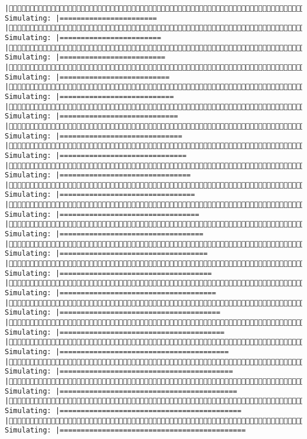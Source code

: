 \documentclass[]{article}
\begin{document}
\begin{verbatim}
|(10/10) Simulating: |=======================                              |(10/10) Simulating: |========================                             |(10/10) Simulating: |=========================                            |(10/10) Simulating: |==========================                           |(10/10) Simulating: |===========================                          |(10/10) Simulating: |============================                         |(10/10) Simulating: |=============================                        |(10/10) Simulating: |==============================                       |(10/10) Simulating: |===============================                      |(10/10) Simulating: |================================                     |(10/10) Simulating: |=================================                    |(10/10) Simulating: |==================================                   |(10/10) Simulating: |===================================                  |(10/10) Simulating: |====================================                 |(10/10) Simulating: |=====================================                |(10/10) Simulating: |======================================               |(10/10) Simulating: |=======================================              |(10/10) Simulating: |========================================             |(10/10) Simulating: |=========================================            |(10/10) Simulating: |==========================================           |(10/10) Simulating: |===========================================          |(10/10) Simulating: |============================================         
\end{verbatim}
\end{document}
